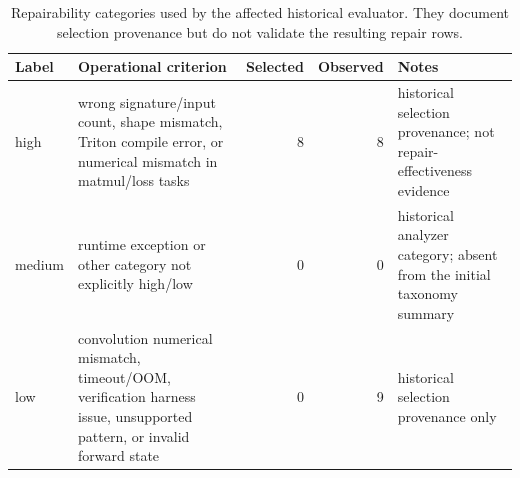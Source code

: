 \begin{table}[htbp]
\centering
\caption{Repairability categories used by the affected historical evaluator. They document selection provenance but do not validate the resulting repair rows.}
\label{tab:kernelbench-repairability}
\scriptsize
\begin{tabularx}{\linewidth}{l X r r X}
\toprule
Label & Operational criterion & Selected & Observed & Notes \\
\midrule
high & wrong signature/input count, shape mismatch, Triton compile error, or numerical mismatch in matmul/loss tasks & 8 & 8 & historical selection provenance; not repair-effectiveness evidence \\
medium & runtime exception or other category not explicitly high/low & 0 & 0 & historical analyzer category; absent from the initial taxonomy summary \\
low & convolution numerical mismatch, timeout/OOM, verification harness issue, unsupported pattern, or invalid forward state & 0 & 9 & historical selection provenance only \\
\bottomrule
\end{tabularx}
\end{table}
